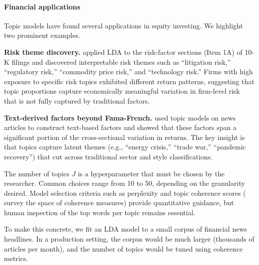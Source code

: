 \paragraph{Financial applications}

Topic models have found several applications in equity investing. We highlight two prominent examples.

\textbf{Risk theme discovery.} \cite{israelsen2014does} applied LDA to the risk-factor sections (Item 1A) of 10-K filings and discovered interpretable risk themes such as ``litigation risk,'' ``regulatory risk,'' ``commodity price risk,'' and ``technology risk.'' Firms with high exposure to specific risk topics exhibited different return patterns, suggesting that topic proportions capture economically meaningful variation in firm-level risk that is not fully captured by traditional factors.

\textbf{Text-derived factors beyond Fama-French.} \cite{lopezlira2023risk} used topic models on news articles to construct text-based factors and showed that these factors span a significant portion of the cross-sectional variation in returns. The key insight is that topics capture latent themes (e.g., ``energy crisis,'' ``trade war,'' ``pandemic recovery'') that cut across traditional sector and style classifications.

The number of topics $J$ is a hyperparameter that must be chosen by the researcher. Common choices range from 10 to 50, depending on the granularity desired. Model selection criteria such as perplexity and topic coherence scores (\cite{roder2015exploring} survey the space of coherence measures) provide quantitative guidance, but human inspection of the top words per topic remains essential.

To make this concrete, we fit an LDA model to a small corpus of financial news headlines. In a production setting, the corpus would be much larger (thousands of articles per month), and the number of topics would be tuned using coherence metrics.


